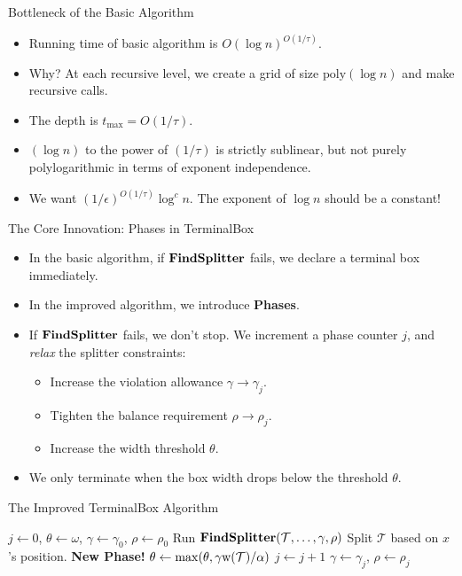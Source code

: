 \documentclass[11pt,aspectratio=169]{beamer}
\newcommand{\width}{{\bf {\rm  w}}}
\newcommand{\findsplitter}{{\rm {\bf FindSplitter}}}
\begin{document}
\begin{frame}{Bottleneck of the Basic Algorithm}
    \begin{itemize}
        \item Running time of basic algorithm is $O(\log n)^{O(1/\tau)}$.
        \item Why? At each recursive level, we create a grid of size $\text{poly}(\log n)$ and make recursive calls.
        \item The depth is $t_{\max} = O(1/\tau)$.
        \item $(\log n)$ to the power of $(1/\tau)$ is strictly sublinear, but not purely polylogarithmic in terms of exponent independence.
        \item We want $(1/\epsilon)^{O(1/\tau)} \log^c n$. The exponent of $\log n$ should be a constant!
    \end{itemize}
\end{frame}

\begin{frame}{The Core Innovation: Phases in TerminalBox}
    \begin{itemize}
        \item In the basic algorithm, if $\findsplitter$ fails, we declare a terminal box immediately.
        \item In the improved algorithm, we introduce \textbf{Phases}.
        \item If $\findsplitter$ fails, we don't stop. We increment a phase counter $j$, and \emph{relax} the splitter constraints:
        \begin{itemize}
            \item Increase the violation allowance $\gamma \to \gamma_j$.
            \item Tighten the balance requirement $\rho \to \rho_j$.
            \item Increase the width threshold $\theta$.
        \end{itemize}
        \item We only terminate when the box width drops below the threshold $\theta$.
    \end{itemize}
\end{frame}

\begin{frame}{The Improved TerminalBox Algorithm}
    \begin{algorithmic}[1]
        \State $j \gets 0$, $\theta \gets \omega$, $\gamma \gets \gamma_0$, $\rho \gets \rho_0$
        \While{$\width(\mathcal{T}) > \theta$}
            \State Run $\findsplitter(\mathcal{T}, \dots, \gamma, \rho)$
                \State Split $\mathcal{T}$ based on $x$'s position.
            \Else
                \State \textbf{New Phase!}
                \State $\theta \gets \max(\theta, \gamma \width(\mathcal{T}) / \alpha)$
                \State $j \gets j + 1$
                \State $\gamma \gets \gamma_j$, $\rho \gets \rho_j$
            \EndIf
        \EndWhile
    \end{algorithmic}
\end{frame}
\end{document}
